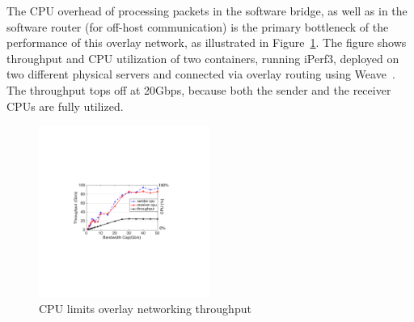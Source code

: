 The CPU overhead of processing packets in the software bridge, as well as in the
software router (for off-host communication) is the primary bottleneck of the
performance of this overlay network, as illustrated in
Figure~\ref{fig:mot_bw_cpu}. The figure shows throughput and CPU utilization of
two containers, running iPerf3, deployed on two different physical servers and
connected via overlay routing using Weave~\cite{weave}. The throughput tops off at 20Gbps, because both the sender and the receiver CPUs are fully utilized.

\begin{figure}[t]
\centering 
\includegraphics[width=0.5\textwidth]{figures/motivation/mot_bw_cpu.pdf} 
\caption{\label{fig:mot_bw_cpu}CPU limits overlay networking throughput}
\end{figure}
